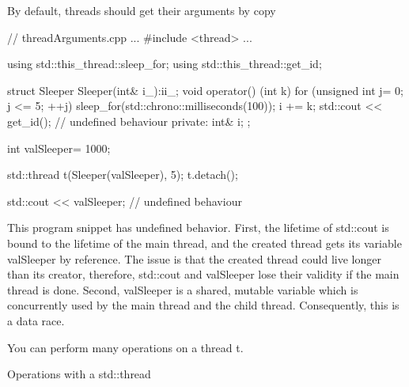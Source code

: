 \begin{myWarning}{By default, threads should get their arguments by	copy}
	
\begin{cpp}
// threadArguments.cpp
...
#include <thread>
...

using std::this_thread::sleep_for;
using std::this_thread::get_id;

struct Sleeper{
	Sleeper(int& i_):i{i_}{};
	void operator() (int k){
		for (unsigned int j= 0; j <= 5; ++j){
			sleep_for(std::chrono::milliseconds(100));
			i += k;
		}
		std::cout << get_id(); // undefined behaviour
	}
	private:
	int& i;
};

int valSleeper= 1000;

std::thread t(Sleeper(valSleeper), 5);
t.detach();

std::cout << valSleeper; // undefined behaviour
\end{cpp}

This program snippet has undefined behavior. First, the lifetime of std::cout is bound to the lifetime of the main thread, and the created thread gets its variable valSleeper by reference. The issue is that the created thread could live longer than its creator, therefore, std::cout and valSleeper lose their validity if the main thread is done. Second, valSleeper is a shared, mutable variable which is concurrently used by the main thread and the child thread. Consequently, this is a data race.
\end{myWarning}


You can perform many operations on a thread t.

\begin{center}
Operations with a std::thread
\end{center}

